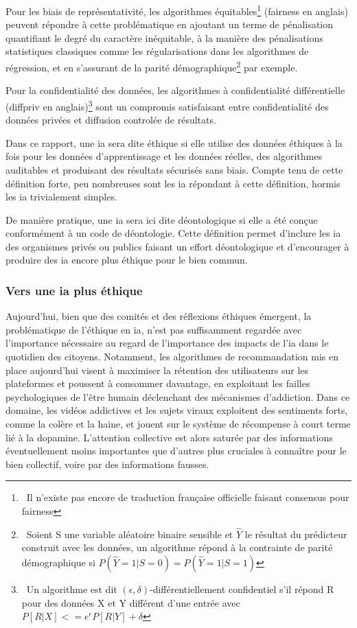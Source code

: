 Pour les biais de représentativité, les algorithmes équitables\footnote{~Il n'existe pas encore de traduction française officielle faisant consensus pour \gls{fairness}} (\gls{fairness} en anglais) peuvent répondre à cette problématique en ajoutant un terme de pénalisation quantifiant le degré du caractère inéquitable, à la manière des pénalisations statistiques classiques comme les régularisations dans les algorithmes de régression, et en s'assurant de la parité démographique\footnote{~Soient S une variable aléatoire binaire sensible et $\hat{Y}$ le résultat du prédicteur construit avec les données, un algorithme répond à la contrainte de parité démographique si $P(\hat{Y}=1|S=0)=P(\hat{Y}=1|S=1)$} par exemple. 

Pour la confidentialité des données, les algorithmes à confidentialité différentielle (\gls{diffpriv} en anglais)\footnote{~Un algorithme est dit $ (\epsilon,\delta)$-différentiellement confidentiel s'il répond R pour des données X et Y différent d'une entrée avec $P[R|X]<=e^\epsilon P[R|Y] + \delta$}  sont un compromis satisfaisant entre confidentialité des données privées et diffusion controlée de résultats.

Dans ce rapport, une \gls{ia} sera dite éthique si elle utilise des données éthiques à la fois pour les données d'apprentissage et les données réelles, des algorithmes auditables et produisant des résultats sécurisés sans biais. Compte tenu de cette définition forte, peu nombreuses sont les \gls{ia} répondant à cette définition, hormis les \gls{ia} trivialement simples.

De manière pratique, une \gls{ia} sera ici dite déontologique si elle a été conçue conformément à un code de déontologie. Cette définition permet d'inclure les \gls{ia} des organismes privés ou publics faisant un effort déontologique et d'encourager à produire des \gls{ia} encore plus éthique pour le bien commun.


\subsubsection{Vers une \gls{ia} plus éthique}

Aujourd'hui, bien que des comités et des réflexions éthiques émergent, la problématique de l'éthique en \gls{ia}, n'est pas suffisamment regardée avec l'importance nécessaire au regard de l'importance des impacts de l'\gls{ia} dans le quotidien des citoyens.
Notamment, les algorithmes de recommandation mis en place aujourd'hui visent à maximiser la rétention des utilisateurs sur les plateformes et poussent à consommer davantage, en exploitant les failles psychologiques de l'être humain déclenchant des mécanismes d'addiction. Dans ce domaine, les vidéos addictives et les sujets viraux exploitent des sentiments forts, comme la colère et la haine, et jouent sur le système de récompense à court terme lié à la dopamine. L'attention collective est alors saturée par des informations éventuellement moins importantes que d'autres plus cruciales à connaître pour le bien collectif, voire par des informations fausses.

